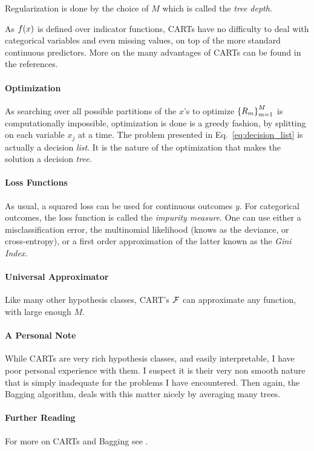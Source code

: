 Regularization is done by the choice of $M$ which is called the \emph{tree depth}.

As $f(x)$ is defined over indicator functions, CARTs have no difficulty to deal with categorical variables and even missing values, on top of the more standard continuous predictors. More on the many advantages of CARTs can be found in the references.

\paragraph{Optimization}
As searching over all possible partitions of the $x$'s to optimize $\left\{ R_m \right\}_{m=1}^M$ is computationally impossible, optimization is done is a greedy fashion, by splitting on each variable $x_j$ at a time.
The problem presented in Eq.~\ref{eq:decision_list} is actually a decision \emph{list}. It is the nature of the optimization that makes the solution a decision \emph{tree}.


\paragraph{Loss Functions}
As usual, a squared loss can be used for continuous outcomes $y$.
For categorical outcomes, the loss function is called the \emph{impurity measure}.
One can use either a misclassification error, the multinomial likelihood (knows as the deviance, or cross-entropy), or a first order approximation of the latter known as the \emph{Gini Index}.


\paragraph{Universal Approximator}
Like many other hypothesis classes, CART's $\mathcal{F}$ can approximate any function, with large enough $M$.

\paragraph{A Personal Note}
While CARTs are very rich hypothesis classes, and easily interpretable, I have poor personal experience with them. 
I suspect it is their very non smooth nature that is simply inadequate for the problems I have encountered.
Then again, the Bagging algorithm, deals with this matter nicely by averaging many trees.


\paragraph{Further Reading}
For more on CARTs and Bagging see \citep[Section 9]{hastie_elements_2003}.


